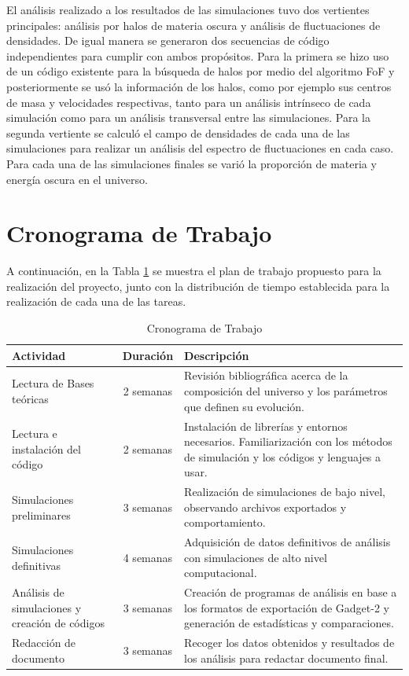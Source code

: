 El análisis realizado a los resultados de las simulaciones tuvo dos vertientes principales: análisis por halos de materia oscura y análisis de fluctuaciones de densidades. De igual manera se generaron dos secuencias de código independientes para cumplir con ambos propósitos. Para la primera se hizo uso de un código existente para la búsqueda de halos por medio del algoritmo FoF y posteriormente se usó la información de los halos, como por ejemplo sus centros de masa y velocidades respectivas, tanto para un análisis intrínseco de cada simulación como para un análisis transversal entre las simulaciones. Para la segunda vertiente se calculó el campo de densidades de cada una de las simulaciones para realizar un análisis del espectro de fluctuaciones en cada caso. Para cada una de las simulaciones finales se varió la proporción de materia y energía oscura en el universo.

\section{Cronograma de Trabajo}
A continuación, en la Tabla \ref{tab:crono} se muestra el plan de trabajo propuesto para la realización del proyecto, junto con la distribución de tiempo establecida para la realización de cada una de las tareas.

\begin{table}[H]
	\centering
	\begin{tabular}{>{\centering}p{5cm}cp{7.5cm}}
		\hline \hline
		\textbf{Actividad} & \textbf{Duración} & \textbf{Descripción} \\
		\hline
		Lectura de Bases teóricas & 2 semanas & Revisión bibliográfica acerca de la composición del universo y los parámetros que definen su evolución.\\
		Lectura e instalación del código & 2 semanas & Instalación de librerías y entornos necesarios. Familiarización con los métodos de simulación y los códigos y lenguajes a usar.\\
		Simulaciones preliminares & 3 semanas & Realización de simulaciones de bajo nivel, observando archivos exportados y comportamiento.\\
		Simulaciones definitivas & 4 semanas & Adquisición de datos definitivos de análisis con simulaciones de alto nivel computacional.\\
		Análisis de simulaciones y creación de códigos& 3 semanas & Creación de programas de análisis en base a los formatos de exportación de Gadget-2 y generación de estadísticas y comparaciones.\\
		Redacción de documento & 3 semanas & Recoger los datos obtenidos y resultados de los análisis para redactar documento final.\\		
		\hline
	\end{tabular}
	\caption[Cronograma de Trabajo]{Cronograma de Trabajo \footnotemark}
	\label{tab:crono}
\end{table}




